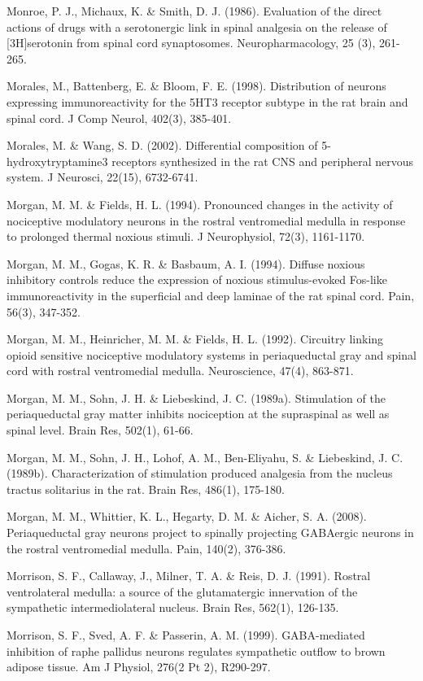 \documentclass[a4paper,12pt,twoside]{report}
\begin{document}
\begin{singlespacing}
\begin{footnotesize}
Monroe, P. J., Michaux, K. \& Smith, D. J. (1986). Evaluation of the direct actions of drugs with a serotonergic link in spinal analgesia on the release of [3H]serotonin from spinal cord synaptosomes. Neuropharmacology, 25 (3), 261-265.

Morales, M., Battenberg, E. \& Bloom, F. E. (1998). Distribution of neurons expressing immunoreactivity for the 5HT3 receptor subtype in the rat brain and spinal cord. J Comp Neurol, 402(3), 385-401.

Morales, M. \& Wang, S. D. (2002). Differential composition of 5-hydroxytryptamine3 receptors synthesized in the rat CNS and peripheral nervous system. J Neurosci, 22(15), 6732-6741.

Morgan, M. M. \& Fields, H. L. (1994). Pronounced changes in the activity of nociceptive modulatory neurons in the rostral ventromedial medulla in response to prolonged thermal noxious stimuli. J Neurophysiol, 72(3), 1161-1170.

Morgan, M. M., Gogas, K. R. \& Basbaum, A. I. (1994). Diffuse noxious inhibitory controls reduce the expression of noxious stimulus-evoked Fos-like immunoreactivity in the superficial and deep laminae of the rat spinal cord. Pain, 56(3), 347-352.

Morgan, M. M., Heinricher, M. M. \& Fields, H. L. (1992). Circuitry linking opioid sensitive nociceptive modulatory systems in periaqueductal gray and spinal cord with rostral ventromedial medulla. Neuroscience, 47(4), 863-871.

Morgan, M. M., Sohn, J. H. \& Liebeskind, J. C. (1989a). Stimulation of the periaqueductal gray matter inhibits nociception at the supraspinal as well as spinal level. Brain Res, 502(1), 61-66.

Morgan, M. M., Sohn, J. H., Lohof, A. M., Ben-Eliyahu, S. \& Liebeskind, J. C. (1989b). Characterization of stimulation produced analgesia from the nucleus tractus solitarius in the rat. Brain Res, 486(1), 175-180.

Morgan, M. M., Whittier, K. L., Hegarty, D. M. \& Aicher, S. A. (2008). Periaqueductal gray neurons project to spinally projecting GABAergic neurons in the rostral ventromedial medulla. Pain, 140(2), 376-386.

Morrison, S. F., Callaway, J., Milner, T. A. \& Reis, D. J. (1991). Rostral ventrolateral medulla: a source of the glutamatergic innervation of the sympathetic intermediolateral nucleus. Brain Res, 562(1), 126-135.

Morrison, S. F., Sved, A. F. \& Passerin, A. M. (1999). GABA-mediated inhibition of raphe pallidus neurons regulates sympathetic outflow to brown adipose tissue. Am J Physiol, 276(2 Pt 2), R290-297.


\end{footnotesize}
\end{singlespacing}
\end{document}
